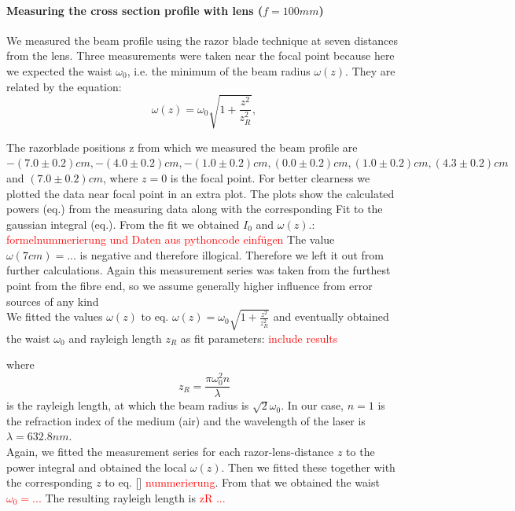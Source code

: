 \documentclass{article}
\begin{document}
\paragraph{Measuring the cross section profile with lens ($f=100mm$)}

We measured the beam profile using the razor blade technique at seven distances from the lens. Three measurements were taken near the focal point because here we expected the waist $\omega_{0}$, i.e. the minimum of the beam radius $\omega (z)$. They are related by the equation:
\begin{equation}
\omega (z) = \omega_{0}\sqrt{1+\frac{z^2}{z_{R}^2}},
\end{equation}

The razorblade positions z from which we measured the beam profile are $-(7.0\pm 0.2)cm, -(4.0\pm 0.2)cm, -(1.0\pm 0.2)cm, (0.0\pm 0.2)cm, (1.0\pm 0.2)cm, (4.3\pm 0.2) cm$ and $(7.0\pm 0.2)cm$, where $z=0$ is the focal point. For better clearness we plotted the data near focal point in an extra plot. The plots show the calculated powers (eq.) from the measuring data along with the corresponding Fit to the gaussian integral (eq.). From the fit we obtained $I_{0}$ and $\omega(z)$.: \\ 

\textcolor{red}{formelnummerierung und Daten aus pythoncode einfügen}
The value $\omega(7cm) = ... $ is negative and therefore illogical. Therefore we left it out from further calculations. Again this measurement series was taken from the furthest point from the fibre end, so we assume generally higher influence from error sources of any kind\\

We fitted the values $\omega(z)$ to eq. $\omega (z) = \omega_{0}\sqrt{1+\frac{z^2}{z_{R}^2}}$ and eventually obtained the waist $\omega_{0}$ and rayleigh length $z_{R}$ as fit parameters: 
\textcolor{red}{include results} 

where 
\begin{equation}
z_{R} = \frac{\pi\omega_{0}^2 n}{\lambda} 
\end{equation}
 is the rayleigh length, at which the beam radius is $\sqrt{2}\omega_{0}$. In our case, $n=1$ is the refraction index of the medium (air) and the wavelength of the laser is $\lambda = 632.8 nm$.\\

Again, we fitted the measurement series for each razor-lens-distance $z$ to the power integral and obtained the local $\omega(z)$. Then we fitted these together with the corresponding $z$ to eq. []
\textcolor{red}{nummerierung}.
From that we obtained the waist 
\textcolor{red}{$\omega_{0} = ...$ }
The resulting rayleigh length is 
\textcolor{red}{zR ...}
\end{document}
